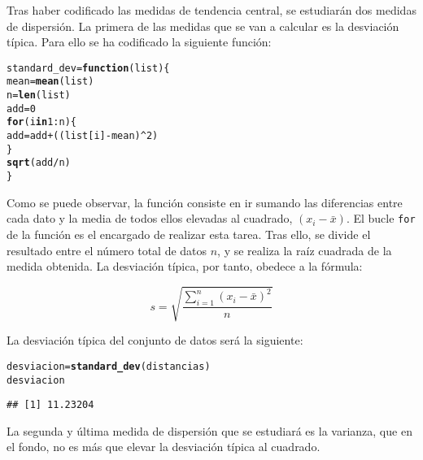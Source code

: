 \documentclass[12pt]{report}\usepackage[]{graphicx}\usepackage[dvipsnames]{xcolor}
\makeatletter
\newcommand{\hlnum}[1]{\textcolor[rgb]{0.686,0.059,0.569}{#1}}%
\newcommand{\hlopt}[1]{\textcolor[rgb]{0,0,0}{#1}}%
\newcommand{\hlstd}[1]{\textcolor[rgb]{0.345,0.345,0.345}{#1}}%
\newcommand{\hlkwa}[1]{\textcolor[rgb]{0.161,0.373,0.58}{\textbf{#1}}}%
\newcommand{\hlkwb}[1]{\textcolor[rgb]{0.69,0.353,0.396}{#1}}%
\newcommand{\hlkwc}[1]{\textcolor[rgb]{0.333,0.667,0.333}{#1}}%
\newcommand{\hlkwd}[1]{\textcolor[rgb]{0.737,0.353,0.396}{\textbf{#1}}}%
\newenvironment{kframe}{%
 \def\at@end@of@kframe{}%
 \ifinner\ifhmode%
  \def\at@end@of@kframe{\end{minipage}}%
  \begin{minipage}{\columnwidth}%
 \fi\fi%
 \def\FrameCommand##1{\hskip\@totalleftmargin \hskip-\fboxsep
 \colorbox{shadecolor}{##1}\hskip-\fboxsep
     \hskip-\linewidth \hskip-\@totalleftmargin \hskip\columnwidth}%
 \MakeFramed {\advance\hsize-\width
   \@totalleftmargin\z@ \linewidth\hsize
   \@setminipage}}%
 {\par\unskip\endMakeFramed%
 \at@end@of@kframe}
\newenvironment{knitrout}{}{} %
\makeatother
\begin{document}
			Tras haber codificado las medidas de tendencia central, se estudiarán dos medidas de dispersión. La primera de las medidas que se van a calcular es la desviación típica. Para ello se ha codificado la siguiente función:
			
\begin{knitrout}
\color{fgcolor}\begin{kframe}
\begin{alltt}
\hlstd{standard_dev} \hlkwb{=} \hlkwa{function}\hlstd{(}\hlkwc{list}\hlstd{)\{}
        \hlstd{mean} \hlkwb{=} \hlkwd{mean}\hlstd{(list)}
        \hlstd{n} \hlkwb{=} \hlkwd{len}\hlstd{(list)}
        \hlstd{add} \hlkwb{=} \hlnum{0}
        \hlkwa{for} \hlstd{(i} \hlkwa{in} \hlnum{1}\hlopt{:}\hlstd{n)\{}
                \hlstd{add} \hlkwb{=} \hlstd{add} \hlopt{+} \hlstd{((list[i]} \hlopt{-} \hlstd{mean)}\hlopt{^}\hlnum{2}\hlstd{)}
        \hlstd{\}}
        \hlkwd{sqrt}\hlstd{(add}\hlopt{/}\hlstd{n)}
\hlstd{\}}
\end{alltt}
\end{kframe}
\end{knitrout}
			
			Como se puede observar, la función consiste en ir sumando las diferencias entre cada dato y la media de todos ellos elevadas al cuadrado, $(x_i - \bar{x})$. El bucle \texttt{for} de la función es el encargado de realizar esta tarea. Tras ello, se divide el resultado entre el número total de datos $n$, y se realiza la raíz cuadrada de la medida obtenida. La desviación típica, por tanto, obedece a la fórmula: 
			
			$$
			s = \sqrt{\frac{\displaystyle\sum_{i=1}^n (x_i-\bar{x})^2}{n}}
			$$
			
			La desviación típica del conjunto de datos será la siguiente:
			
\begin{knitrout}
\color{fgcolor}\begin{kframe}
\begin{alltt}
\hlstd{desviacion} \hlkwb{=} \hlkwd{standard_dev}\hlstd{(distancias)}
\hlstd{desviacion}
\end{alltt}
\begin{verbatim}
## [1] 11.23204
\end{verbatim}
\end{kframe}
\end{knitrout}
			
			La segunda y última medida de dispersión que se estudiará es la varianza, que en el fondo, no es más que elevar la desviación típica al cuadrado.
			
\end{document}
